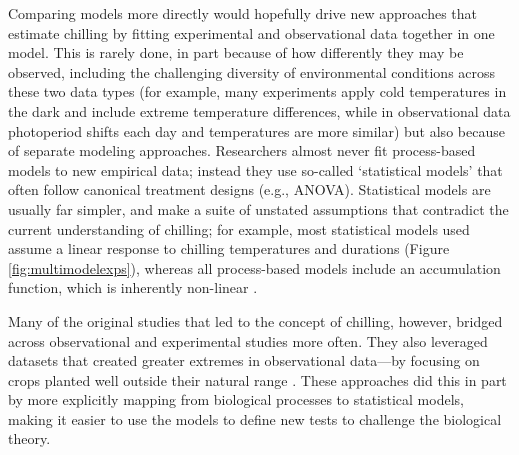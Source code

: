 \documentclass[11pt]{article}
\newcommand{\R}[1]{\label{#1}\linelabel{#1}}
\begin{document}
Comparing models more directly would hopefully drive new approaches that estimate chilling by fitting experimental and observational data together in one model. This is rarely done, in part because of how differently they may be observed, including the challenging diversity of environmental conditions across these two data types (for example, many experiments apply cold temperatures in the dark and include extreme temperature differences, while in observational data photoperiod shifts each day and temperatures are more similar) but also because of separate modeling approaches. Researchers almost never fit process-based models to new empirical data; instead they use so-called `statistical models' that often follow canonical treatment designs (e.g., ANOVA). \R{r2confS}Statistical models are usually far simpler, and make a suite of unstated assumptions that contradict the current understanding of chilling; for example, most statistical models used assume a linear response to chilling temperatures and durations (Figure \ref{fig:multimodelexps}), whereas all process-based models include an accumulation function, which is inherently non-linear \citep[][]{decsens}.\R{r2confE} 

Many of the original studies that led to the concept of chilling, however, bridged across observational and experimental studies more often. They also leveraged datasets that created greater extremes in observational data---by focusing on crops planted well outside their natural range \citep[e.g., peaches in Florida and Israel, ][]{erez1971,richardson1974}. These approaches did this in part by more explicitly mapping from biological processes to statistical models, making it easier to use the models to define new tests to challenge the biological theory. %
\end{document}
